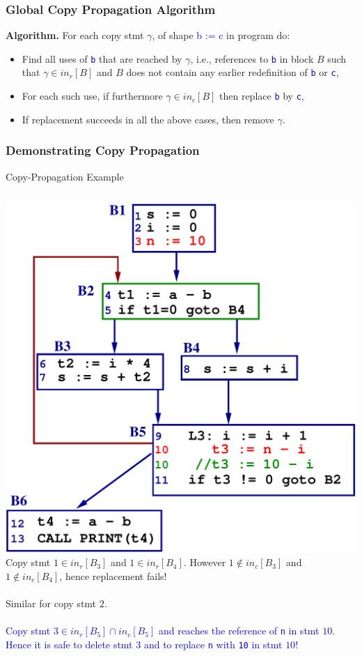 \documentclass{beamer}
\newcommand{\blue}[1]{\textcolor{Blue}{{#1}}}
\renewcommand{\emph}[1]{\textcolor{structure}{#1}}
\newcommand{\emp}[1]{\textcolor{DikuRed}{ #1}}
\begin{document}
\begin{frame}[fragile,t]
    \frametitle{Global Copy Propagation Algorithm}

\bigskip

\emph{\bf Algorithm.} For each copy stmt $\gamma$, of shape \blue{b := c} in program do:


\bigskip

\begin{itemize}
    \item Find all uses of \blue{\tt b} that are reached by $\gamma$, i.e., references to \blue{\tt b} in
            block $B$ such that $\gamma\in in_r[B]$ and $B$ does not contain any earlier
            redefinition of \blue{\tt b} or \blue{\tt c},\smallskip

    \item For each such use, if furthermore $\gamma \in in_c[B]$ then replace \blue{\tt b} by \blue{\tt c},\smallskip

    \item If replacement succeeds in all the above cases, then remove $\gamma$.
\end{itemize}

\end{frame}



\begin{frame}[fragile,t]
    \frametitle{Demonstrating Copy Propagation}


\begin{block}{Copy-Propagation Example}
\begin{columns}
\includegraphics[width=37ex]{Figures/LoopCP}
\emp{Copy stmt $1\in in_r[B_3]$ and
$1\in in_r[B_4]$. However 
$1\not\in in_c[B_3]$ and $1\not\in in_c[B_4]$,
hence replacement fails!}\\
$\mbox{~}$\\
\emp{Similar for copy stmt $2$.}\\
$\mbox{~}$\\
\blue{Copy stmt $3\in in_r[B_5]\cap in_c[B_5]$
and reaches the reference of {\tt n} in stmt $10$.}\\
\blue{Hence it is safe to delete stmt
$3$ and to replace {\tt n} with {\tt 10} in
stmt $10$!}
\end{columns}
\end{block}

\end{frame}
\end{document}
